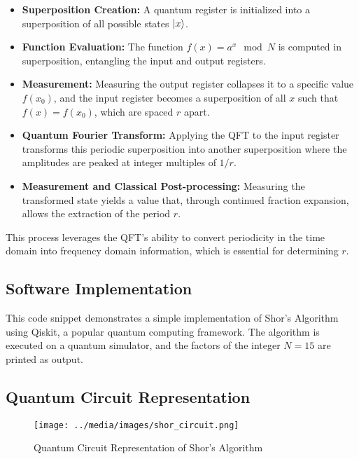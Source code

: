 \documentclass{article}
\begin{document}
\begin{itemize}
    \item \textbf{Superposition Creation:} A quantum register is initialized into a superposition of all possible states $\ket{x}$.
    \item \textbf{Function Evaluation:} The function $f(x) = a^x \mod N$ is computed in superposition, entangling the input and output registers.
    \item \textbf{Measurement:} Measuring the output register collapses it to a specific value $f(x_0)$, and the input register becomes a superposition of all $x$ such that $f(x) = f(x_0)$, which are spaced $r$ apart.
    \item \textbf{Quantum Fourier Transform:} Applying the QFT to the input register transforms this periodic superposition into another superposition where the amplitudes are peaked at integer multiples of $1/r$.
    \item \textbf{Measurement and Classical Post-processing:} Measuring the transformed state yields a value that, through continued fraction expansion, allows the extraction of the period $r$.
\end{itemize}

This process leverages the QFT's ability to convert periodicity in the time domain into frequency domain information, which is essential for determining $r$.

\subsection{Software Implementation}



This code snippet demonstrates a simple implementation of Shor's Algorithm using Qiskit, a popular quantum computing framework. The algorithm is executed on a quantum simulator, and the factors of the integer \( N = 15 \) are printed as output.

\subsection{Quantum Circuit Representation}

\begin{figure}[!h]
    \centering
    \texttt{[image: ../media/images/shor\_circuit.png]}
    \caption{Quantum Circuit Representation of Shor's Algorithm}
    \label{fig:shor_circuit}
\end{figure}
\end{document}
